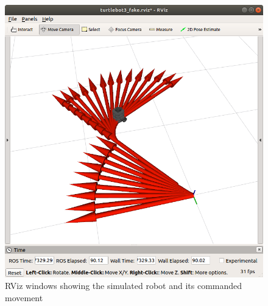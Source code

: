 \begin{figure}[H]
\centering
 \includegraphics[scale=0.5]{Figures/ros_install/rviz_simulation.png}
 \caption{RViz windows showing the simulated robot and its commanded movement}
 \label{figure:rviz_simulation}
\end{figure}